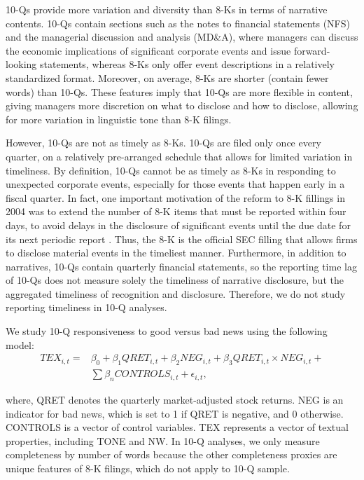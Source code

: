 \documentclass[letterpaper,12pt]{article}
\begin{document}
\begin{spacing}{1.5}
10-Qs provide more variation and diversity than 8-Ks in terms of narrative contents. 10-Qs contain sections such as the notes to financial statements (NFS) and the managerial discussion and analysis (MD\&A), where managers can discuss the economic implications of significant corporate events and issue forward-looking statements, whereas 8-Ks only offer event descriptions in a relatively standardized format. Moreover, on average, 8-Ks are shorter (contain fewer words) than 10-Qs. These features imply that 10-Qs are more flexible in content, giving managers more discretion on what to disclose and how to disclose, allowing for more variation in linguistic tone than 8-K filings.

However, 10-Qs are not as timely as 8-Ks. 10-Qs are filed only once every quarter, on a relatively pre-arranged schedule that allows for limited variation in timeliness. By definition, 10-Qs cannot be as timely as 8-Ks in responding to unexpected corporate events, especially for those events that happen early in a fiscal quarter. In fact, one important motivation of the reform to 8-K fillings in 2004 was to extend the number of 8-K items that must be reported within four days, to avoid delays in the disclosure of significant events until the due date for its next periodic report \cite{secFinalRuleAdditional2004}. Thus, the 8-K is the official SEC filling that allows firms to disclose material events in the timeliest manner. Furthermore, in addition to narratives, 10-Qs contain quarterly financial statements, so the reporting time lag of 10-Qs does not measure solely the timeliness of narrative disclosure, but the aggregated timeliness of recognition and disclosure. Therefore, we do not study reporting timeliness in 10-Q analyses. 

We study 10-Q responsiveness to good versus bad news using the following model: 
\begin{equation}
	\begin{aligned} 
		\label{eq2}
		TEX_{i,t}=
		&\beta_0+\beta_1QRET_{i,t}+\beta_2NEG_{i,t}+\beta_3QRET_{i,t}\times NEG_{i,t}+\\
		&\sum\beta_nCONTROLS_{i,t}+\epsilon_{i,t},
	\end{aligned} 
\end{equation}

\noindent where, QRET denotes the quarterly market-adjusted stock returns. NEG is an indicator for bad news, which is set to 1 if QRET is negative, and 0 otherwise. CONTROLS is a vector of control variables. TEX represents a vector of textual properties, including TONE and NW. In 10-Q analyses, we only measure completeness by number of words because the other completeness proxies are unique features of 8-K filings, which do not apply to 10-Q sample.  


\end{spacing}
\end{document}

